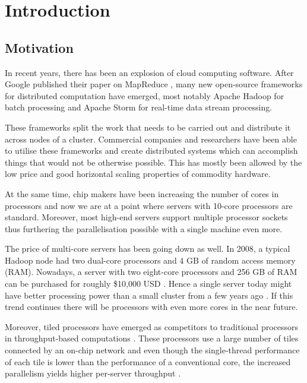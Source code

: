 \chapter{Introduction}

\section{Motivation}

In recent years, there has been an explosion of cloud computing software. After Google published their paper on MapReduce \citep{dean2010mapreduce}, many new open-source frameworks for distributed computation have emerged, most notably Apache Hadoop \citep{ApacheHadoop} for batch processing and Apache Storm \citep{ApacheStorm} for real-time data stream processing.

These frameworks split the work that needs to be carried out and distribute it across nodes of a cluster. Commercial companies and researchers have been able to utilise these frameworks and create distributed systems which can accomplish things that would not be otherwise possible. This has mostly been allowed by the low price and good horizontal scaling properties of commodity hardware.


At the same time, chip makers have been increasing the number of cores in processors and now we are at a point where servers with 10-core processors are standard. Moreover, most high-end servers support multiple processor sockets thus furthering the parallelisation possible with a single machine even more.

The price of multi-core servers has been going down as well. In 2008, a typical Hadoop node had two dual-core processors and 4 GB of random access memory (RAM). Nowadays, a server with two eight-core processors and 256 GB of RAM can be purchased for roughly \$10,000 USD \citep{Kumar:2013:HSD:2536274.2536314}. Hence a single server today might have better processing power than a small cluster from a few years ago \citep{Kumar:2013:HSD:2536274.2536314}. If this trend continues there will be processors with even more cores in the near future.

Moreover, tiled processors have emerged as competitors to traditional processors in throughput-based computations \cite{Tilera}. These processors use a large number of tiles connected by an on-chip network and even though the single-thread performance of each tile is lower than the performance of a conventional core, the increased parallelism yields higher per-server throughput \cite{DBLP:conf/isca/Lotfi-KamranGFVKPAJIOF12}.

